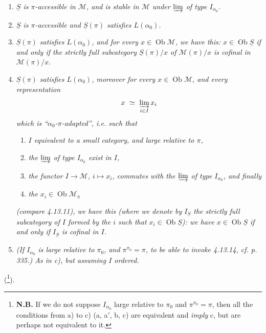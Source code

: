 \documentclass[11pt]{article}
\newcommand{\msp}[1]{\marginpar{\footnotesize [#1]}}
\DeclareMathOperator{\Ob}{Ob}
\begin{document}
\begin{enumerate}[label={}]
\item[\textit{a)}] \textit{$\underline{S}$ is $\pi$-accessible in $\mathcal{M}$, and is stable in $\mathcal{M}$ under $\varinjlim$ of type $I_{\alpha_0}$.}
\item[\textit{a$'$)}] \textit{$\underline{S}$ is $\pi$-accessible and $\underline{S}(\pi)$ satisfies $L(\alpha_0)$.}
\item[\textit{b)}] \textit{$\underline{S}(\pi)$ satisfies $L(\alpha_0)$, and for every $x \in \Ob\mathcal{M}$, we have this: $x \in \Ob\underline{S}$ if and only if the strictly full subcategory $\underline{S}(\pi)/x$ of $\mathcal{M}(\pi)/x$ is cofinal in $\mathcal{M}(\pi)/x$}.
\item[\textit{c)}] \textit{$\underline{S}(\pi)$ satisfies $L(\alpha_0)$, moreover for every $x \in \Ob\mathcal{M}$, and every representation}
\[
x \ \simeq \ \varinjlim_{i\in I} x_i
\]
\msp{page 339}
\textit{which is ``$\alpha_0$-$\pi$-adapted'', i.e. such that}
\begin{enumerate}[label={}]
\item[\textit{$1^\circ$)}] \textit{$I$ equivalent to a small category, and large relative to $\pi$,}
\item[\textit{$2^\circ$)}] \textit{the $\varinjlim$ of type $I_{\alpha_0}$ exist in $I$,}
\item[\textit{$3^\circ$)}] \textit{the functor $I \longrightarrow \mathcal{M}$, $i \longmapsto x_i$, commutes with the $\varinjlim$ of type $I_{\alpha_0}$, and finally}
\item[\textit{$4^\circ$)}] \textit{the $x_i \in \Ob\mathcal{M}_\pi$}
\end{enumerate}
\textit{(compare 4.13.11), we have this (where we denote by $I_{\underline{S}}$ the strictly full subcategory of $I$ formed by the $i$ such that $x_i \in \Ob\underline{S}$): we have $x \in \Ob\underline{S}$ if and only if $I_{\underline{S}}$ is cofinal in $I$.}
\item[\textit{c$'$)}] \textit{(\textup{If} $I_{\alpha_0}$ is large relative to $\pi_0$, and $\pi^{\pi_0} = \pi$, to be able to invoke 4.13.14, cf. p. 335.) As in c), but assuming $I$ ordered.}
\end{enumerate}
(\footnote[143]{\textbf{N.B.} If we do not suppose $I_{\alpha_0}$ large relative to $\pi_0$ and %
$\pi^{\pi_0} = \pi$, then all the conditions from a) to c) (a, a$'$, b, c) are equivalent and \textit{imply} c, but are perhaps not equivalent to it.}).
\end{document}
